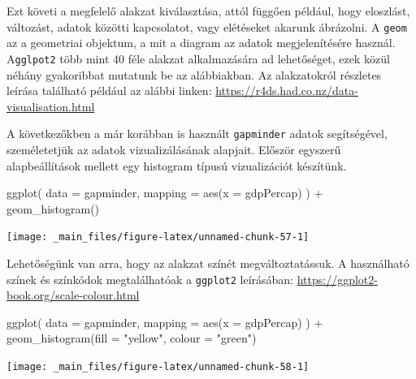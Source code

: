 \documentclass[
]{book}
\newenvironment{Shaded}{\begin{snugshade}}{\end{snugshade}}
\newcommand{\AttributeTok}[1]{\textcolor[rgb]{0.77,0.63,0.00}{#1}}
\newcommand{\FunctionTok}[1]{\textcolor[rgb]{0.00,0.00,0.00}{#1}}
\newcommand{\NormalTok}[1]{#1}
\newcommand{\SpecialCharTok}[1]{\textcolor[rgb]{0.00,0.00,0.00}{#1}}
\newcommand{\StringTok}[1]{\textcolor[rgb]{0.31,0.60,0.02}{#1}}
\begin{document}
Ezt követi a megfelelő alakzat kiválasztása, attól függően például, hogy
eloszlást, változást, adatok közötti kapcsolatot, vagy elétéseket
akarunk ábrázolni. A \texttt{geom} az a geometriai objektum, a mit a
diagram az adatok megjelenítésére használ. A\texttt{gglpot2} több mint
40 féle alakzat alkalmazására ad lehetőséget, ezek közül néhány
gyakoribbat mutatunk be az alábbiakban. Az alakzatokról részletes
leírása található például az alábbi linken:
\url{https://r4ds.had.co.nz/data-visualisation.html}

A következőkben a már korábban is használt \texttt{gapminder} adatok
segítségével, személetetjük az adatok vizualizálásának alapjait. Először
egyszerű alapbeállítások mellett egy histogram típusú vizualizációt
készítünk.

\begin{Shaded}
\begin{Highlighting}[]
\FunctionTok{ggplot}\NormalTok{(}
  \AttributeTok{data =}\NormalTok{ gapminder,}
  \AttributeTok{mapping =} \FunctionTok{aes}\NormalTok{(}\AttributeTok{x =}\NormalTok{ gdpPercap)}
\NormalTok{) }\SpecialCharTok{+}
  \FunctionTok{geom\_histogram}\NormalTok{()}
\end{Highlighting}
\end{Shaded}

\begin{center}\texttt{[image: \_main\_files/figure-latex/unnamed-chunk-57-1]} \end{center}

Lehetőségünk van arra, hogy az alakzat színét megváltoztatássuk. A
használható színek és színkódok megtalálhatóak a \texttt{ggplot2}
leírásában: \url{https://ggplot2-book.org/scale-colour.html}

\begin{Shaded}
\begin{Highlighting}[]
\FunctionTok{ggplot}\NormalTok{(}
  \AttributeTok{data =}\NormalTok{ gapminder,}
  \AttributeTok{mapping =} \FunctionTok{aes}\NormalTok{(}\AttributeTok{x =}\NormalTok{ gdpPercap)}
\NormalTok{) }\SpecialCharTok{+}
  \FunctionTok{geom\_histogram}\NormalTok{(}\AttributeTok{fill =} \StringTok{"yellow"}\NormalTok{, }\AttributeTok{colour =} \StringTok{"green"}\NormalTok{)}
\end{Highlighting}
\end{Shaded}

\begin{center}\texttt{[image: \_main\_files/figure-latex/unnamed-chunk-58-1]} \end{center}
\end{document}
